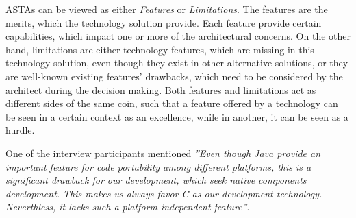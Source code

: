 \documentclass[conference]{IEEEtran}
\begin{document}
ASTAs can be viewed as either \textit{Features} or \textit{Limitations}. The
features are the merits, which the technology solution provide. Each feature
provide certain capabilities, which impact one or more of the architectural
concerns. On the other hand, limitations are either technology features, which
are missing in this technology solution, even though they exist in other
alternative solutions, or they are well-known existing features’ drawbacks,
which need to be considered by the architect during the decision making. Both
features and limitations act as different sides of the same coin, such that a
feature offered by a technology can be seen in a certain context as an
excellence, while in another, it can be seen as a hurdle.

One of the interview participants mentioned \textit{''Even though Java provide
an important feature for code portability among different platforms, this is a
significant drawback for our development, which seek native components
development. This makes us always favor C as our development technology.
Neverthless, it lacks such a platform independent feature''}.
\end{document}
